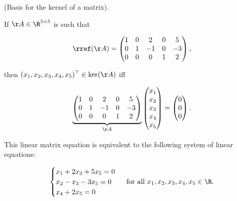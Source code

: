 \begin{example}
    (Basis for the kernel of a matrix).

    If $\AA \in \R^{3 \times 5}$ is such that
    
    \begin{align*}
        \rref(\AA) = 
        \begin{pmatrix}
            1 & 0 & 2 & 0 & 5 \\
            0 & 1 & -1 & 0 & -3 \\
            0 & 0 & 0 & 1 & 2
        \end{pmatrix},
    \end{align*}

     then $(x_1, x_2, x_3, x_4, x_5)^\top \in \ker(\AA)$ iff
     
     \begin{align*}
         \underbrace{
             \begin{pmatrix}
                1 & 0 & 2 & 0 & 5 \\
                0 & 1 & -1 & 0 & -3 \\
                0 & 0 & 0 & 1 & 2
            \end{pmatrix}
         }_{\AA}
         \begin{pmatrix} x_1 \\ x_2 \\ x_3 \\ x_4 \\ x_5 \end{pmatrix}
         =
         \begin{pmatrix}
             0 \\ 0 \\ 0
         \end{pmatrix}.
     \end{align*}

     This linear matrix equation is equivalent to the following system of linear equations:

     \begin{align*}
         \begin{cases}
             x_1 + 2x_3 + 5x_5 = 0 \\
             x_2 - x_3 - 3x_5 = 0 \\ 
             x_4 + 2x_5 = 0 \\
         \end{cases}
         \text{ for all $x_1, x_2, x_3, x_4, x_5 \in \R$}.
     \end{align*}


\end{example}
